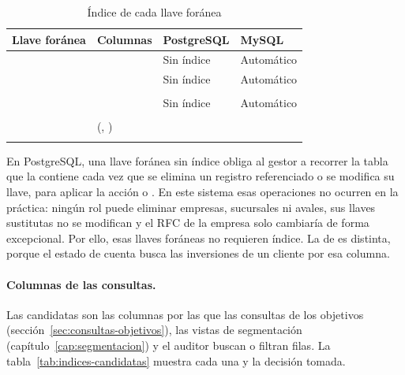 \begin{table}[H]
	\centering
	\small
	\caption{Índice de cada llave foránea}
	\label{tab:indices-fk}
	\begin{tabular}{@{}L{4cm} L{4.6cm} L{3.4cm} L{3.4cm}@{}}
		\toprule
		\textbf{Llave foránea} & \textbf{Columnas} & \textbf{PostgreSQL} & \textbf{MySQL} \\
		\midrule
		 &  & Sin índice & Automático \\
		 &  & Sin índice & Automático \\
		 &  &  &  \\
		 &  & Sin índice & Automático \\
		 &  &  &  \\
		 &  (, ) &  &  \\
		 &  &  &  \\
		\bottomrule
	\end{tabular}
\end{table}

En PostgreSQL, una llave foránea sin índice obliga al gestor a recorrer la tabla que la contiene cada vez que se elimina un registro referenciado o se modifica su llave, para aplicar la acción  o . En este sistema esas operaciones no ocurren en la práctica: ningún rol puede eliminar empresas, sucursales ni avales, sus llaves sustitutas no se modifican y el RFC de la empresa solo cambiaría de forma excepcional. Por ello, esas llaves foráneas no requieren índice. La de  es distinta, porque el estado de cuenta busca las inversiones de un cliente por esa columna.

\paragraph{Columnas de las consultas.} Las candidatas son las columnas por las que las consultas de los objetivos (sección~\ref{sec:consultas-objetivos}), las vistas de segmentación (capítulo~\ref{cap:segmentacion}) y el auditor buscan o filtran filas. La tabla~\ref{tab:indices-candidatas} muestra cada una y la decisión tomada.


